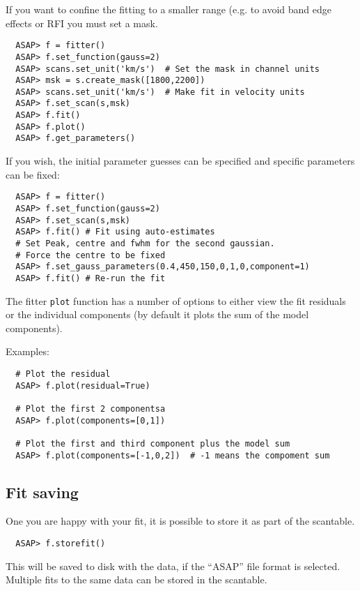 \documentclass[11pt]{article}
\newcommand{\cmd}[1]{{\tt #1}}
\begin{document}
If you want to confine the fitting to a smaller range (e.g. to avoid
band edge effects or RFI you must set a mask.

\begin{verbatim}
  ASAP> f = fitter()
  ASAP> f.set_function(gauss=2)
  ASAP> scans.set_unit('km/s')  # Set the mask in channel units
  ASAP> msk = s.create_mask([1800,2200])
  ASAP> scans.set_unit('km/s')  # Make fit in velocity units
  ASAP> f.set_scan(s,msk)
  ASAP> f.fit()
  ASAP> f.plot()
  ASAP> f.get_parameters()
\end{verbatim}

If you wish, the initial parameter guesses can be specified and
specific parameters can be fixed:

\begin{verbatim}
  ASAP> f = fitter()
  ASAP> f.set_function(gauss=2)
  ASAP> f.set_scan(s,msk)
  ASAP> f.fit() # Fit using auto-estimates
  # Set Peak, centre and fwhm for the second gaussian. 
  # Force the centre to be fixed
  ASAP> f.set_gauss_parameters(0.4,450,150,0,1,0,component=1)
  ASAP> f.fit() # Re-run the fit
\end{verbatim}

The fitter \cmd{plot} function has a number of options to either view
the fit residuals or the individual components (by default it plots
the sum of the model components).

Examples:

\begin{verbatim}
  # Plot the residual
  ASAP> f.plot(residual=True) 

  # Plot the first 2 componentsa
  ASAP> f.plot(components=[0,1]) 

  # Plot the first and third component plus the model sum
  ASAP> f.plot(components=[-1,0,2])  # -1 means the compoment sum
\end{verbatim}

\subsection{Fit saving}

One you are happy with your fit, it is possible to store it as part of
the scantable.

\begin{verbatim}
  ASAP> f.storefit()
\end{verbatim}

This will be saved to disk with the data, if the ``ASAP'' file format
is selected. Multiple fits to the same data can be stored in the
scantable. 
\end{document}
